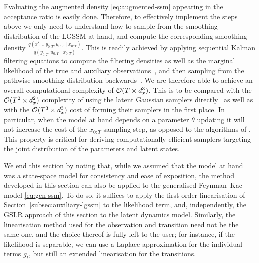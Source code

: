 Evaluating the augmented density \eqref{eq:augmented-ssm} appearing in the acceptance ratio is easily done. Therefore, to effectively implement the steps above we only need to understand how to sample from the smoothing distribution of the LGSSM at hand, and compute the corresponding smoothing density $\frac{q(x^*_{0:T}, y_{0:T}, u_{0:T} \mid x_{0:T})}{q(y_{0:T}, u_{0:T} \mid x_{0:T})}$. This is readily achieved by applying sequential Kalman filtering equations to compute the filtering densities as well as the marginal likelihood of the true and auxiliary observations~\citep[see, e.g.,][Chap. 4]{sarkka2013bayesian}, and then sampling from the pathwise smoothing distribution backwards~\citep{deJong1995ffbs}. We are therefore able to achieve an overall computational complexity of $\mathcal{O}(T \times d_x^3)$. This is to be compared with the $\mathcal{O}(T^2 \times d_x^2)$ complexity of using the latent Gaussian samplers directly~\citep[Section 3.3]{titsias2018} as well as with the $\mathcal{O}(T^3 \times d_x^3)$ cost of forming their samplers in the first place. In particular, when the model at hand depends on a parameter $\theta$ updating it will not increase the cost of the $x_{0:T}$ sampling step, as opposed to the algorithms of \citet{titsias2018}. This property is critical for deriving computationally efficient samplers targeting the joint distribution of the parameters and latent states.

We end this section by noting that, while we assumed that the model at hand was a state-space model for consistency and ease of exposition, the method developed in this section can also be applied to the generalised Feynman--Kac model \eqref{eq:gen-ssm}. To do so, it suffices to apply the first order linearisation of Section~\ref{subsec:auxiliary-lgssm} to the likelihood term, and, independently, the GSLR approach of this section to the latent dynamics model. Similarly, the linearisation method used for the observation and transition need not be the same one, and the choice thereof is fully left to the user; for instance, if the likelihood is separable, we can use a Laplace approximation for the individual terms $g_t$, but still an extended linearisation for the transitions.
